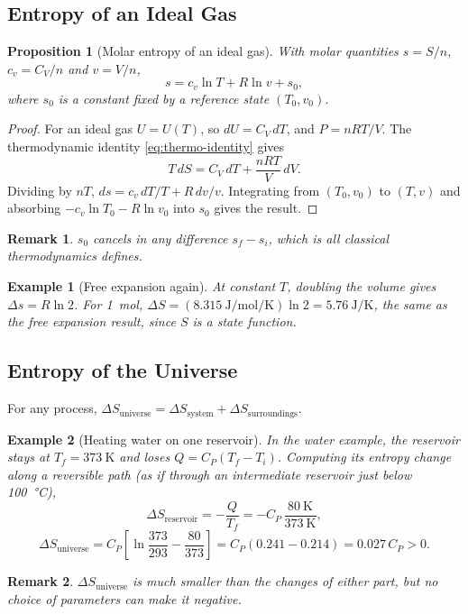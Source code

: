 \documentclass{article}
\newtheorem*{example}{Example}
\newtheorem{remark}{Remark}
\newtheorem{proposition}{Proposition}
\begin{document}
\subsection{Entropy of an Ideal Gas}
\begin{proposition}[Molar entropy of an ideal gas]
    With molar quantities $s = S/n$, $c_v = C_V/n$ and $v = V/n$,
    \[s = c_v \ln T + R \ln v + s_0,\]
    where $s_0$ is a constant fixed by a reference state $(T_0, v_0)$.
\end{proposition}
\begin{proof}
    For an ideal gas $U = U(T)$, so $dU = C_V\,dT$, and $P = nRT/V$. The thermodynamic identity \eqref{eq:thermo-identity} gives
    \[T\,dS = C_V\,dT + \frac{nRT}{V}\,dV.\]
    Dividing by $nT$, $ds = c_v\,dT/T + R\,dv/v$. Integrating from $(T_0, v_0)$ to $(T, v)$ and absorbing $-c_v \ln T_0 - R \ln v_0$ into $s_0$ gives the result.
\end{proof}
\begin{remark}
    $s_0$ cancels in any difference $s_f - s_i$, which is all classical thermodynamics defines.
\end{remark}
\begin{example}[Free expansion again]
    At constant $T$, doubling the volume gives $\Delta s = R \ln 2$. For \SI{1}{\mole}, $\Delta S = (\SI{8.315}{\joule\per\mole\per\kelvin})\ln 2 = \SI{5.76}{\joule\per\kelvin}$, the same as the free expansion result, since $S$ is a state function.
\end{example}

\subsection{Entropy of the Universe}
For any process, $\Delta S_{\text{universe}} = \Delta S_{\text{system}} + \Delta S_{\text{surroundings}}$.

\begin{example}[Heating water on one reservoir]
    In the water example, the reservoir stays at $T_f = \SI{373}{\kelvin}$ and loses $Q = C_P(T_f - T_i)$. Computing its entropy change along a reversible path (as if through an intermediate reservoir just below \SI{100}{\celsius}),
    \[\Delta S_{\text{reservoir}} = -\frac{Q}{T_f} = -C_P\,\frac{\SI{80}{\kelvin}}{\SI{373}{\kelvin}},\]
    \[\Delta S_{\text{universe}} = C_P\left[\ln\frac{373}{293} - \frac{80}{373}\right] = C_P(0.241 - 0.214) = 0.027\,C_P > 0.\]
\end{example}
\begin{remark}
    $\Delta S_{\text{universe}}$ is much smaller than the changes of either part, but no choice of parameters can make it negative.
\end{remark}
\end{document}
